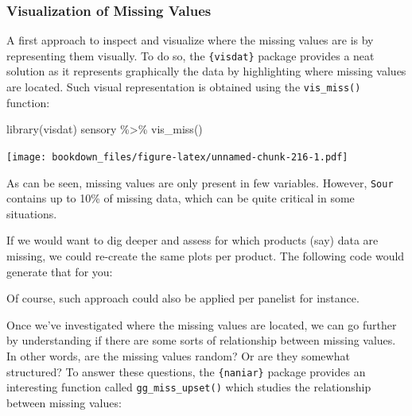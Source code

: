 \documentclass[
]{krantz}
\makeatletter
\newenvironment{Shaded}{\begin{snugshade}}{\end{snugshade}}
\newcommand{\ControlFlowTok}[1]{\textcolor[rgb]{0.27,0.27,0.27}{\textbf{#1}}}
\newcommand{\FunctionTok}[1]{\textcolor[rgb]{0,0,0}{#1}}
\newcommand{\NormalTok}[1]{#1}
\newcommand{\SpecialCharTok}[1]{\textcolor[rgb]{0,0,0}{#1}}
\newenvironment{kframe}{%
\medskip{}
\setlength{\fboxsep}{.8em}
 \def\at@end@of@kframe{}%
 \ifinner\ifhmode%
  \def\at@end@of@kframe{\end{minipage}}%
  \begin{minipage}{\columnwidth}%
 \fi\fi%
 \def\FrameCommand##1{\hskip\@totalleftmargin \hskip-\fboxsep
 \colorbox{shadecolor}{##1}\hskip-\fboxsep
     \hskip-\linewidth \hskip-\@totalleftmargin \hskip\columnwidth}%
 \MakeFramed {\advance\hsize-\width
   \@totalleftmargin\z@ \linewidth\hsize
   \@setminipage}}%
 {\par\unskip\endMakeFramed%
 \at@end@of@kframe}
\renewenvironment{Shaded}{\begin{kframe}}{\end{kframe}}
\makeatother
\begin{document}
\hypertarget{visualization-of-missing-values}{%
\subsubsection{Visualization of Missing Values}\label{visualization-of-missing-values}}

A first approach to inspect and visualize where the missing values are is by representing them visually. To do so, the \texttt{\{visdat\}} package provides a neat solution as it represents graphically the data by highlighting where missing values are located. Such visual representation is obtained using the \texttt{vis\_miss()} function:

\begin{Shaded}
\begin{Highlighting}[]
\FunctionTok{library}\NormalTok{(visdat)}
\NormalTok{sensory }\SpecialCharTok{\%\textgreater{}\%} 
  \FunctionTok{vis\_miss}\NormalTok{()}
\end{Highlighting}
\end{Shaded}

\texttt{[image: bookdown\_files/figure-latex/unnamed-chunk-216-1.pdf]}

As can be seen, missing values are only present in few variables. However, \texttt{Sour} contains up to 10\% of missing data, which can be quite critical in some situations.

If we would want to dig deeper and assess for which products (say) data are missing, we could re-create the same plots per product. The following code would generate that for you:

\begin{Shaded}
\end{Shaded}

Of course, such approach could also be applied per panelist for instance.

Once we've investigated where the missing values are located, we can go further by understanding if there are some sorts of relationship between missing values. In other words, are the missing values random? Or are they somewhat structured?
To answer these questions, the \texttt{\{naniar\}} package provides an interesting function called \texttt{gg\_miss\_upset()} which studies the relationship between missing values:
\end{document}
